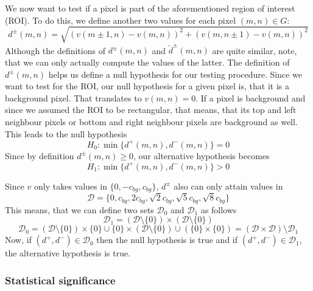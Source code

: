 \documentclass[a4paper,12pt]{article}
\theoremstyle{plain}
\theoremstyle{definition}
\theoremstyle{remark}
\begin{document}
We now want to test if a pixel is part of the aforementioned region of interest (ROI). To do this, we define another two values for each pixel $(m, n) \in G$:
\begin{equation}\label{d}
	d^\pm(m, n) = \sqrt{(v(m \pm 1, n) - v(m, n))^2 + (v(m, n \pm 1) - v(m, n))^2}
\end{equation}
Although the definitions of $d^\pm(m, n)$ and $\tilde{d}^\pm(m, n)$ are quite similar, note, that we can only actually compute the values of the latter. The definition of $d^\pm(m, n)$ helps us define a null hypothesis for our testing procedure. Since we want to test for the ROI, our null hypothesis for a given pixel is, that it is a background pixel. That translates to $v(m, n) = 0$. If a pixel is background and since we assumed the ROI to be rectangular, that means, that its top and left neighbour pixels or bottom and right neighbour pixels are background as well. This leads to the null hypothesis
\begin{equation}
	H_0 : \min\{ d^+(m, n), d^-(m, n) \} = 0
\end{equation}
Since by definition $d^\pm(m, n) \geq 0$, our alternative hypothesis becomes
\begin{equation}
	H_1 : \min\{ d^+(m, n), d^-(m, n) \} > 0
\end{equation}

Since $v$ only takes values in $\{ 0, -c_{bg}, c_{bg} \}$, $d^\pm$ also can only attain values in
\begin{equation*}
	\mathcal{D} = \{ 0, c_{bg}, 2 c_{bg}, \sqrt{2} c_{bg}, \sqrt{5} c_{bg}, \sqrt{8} c_{bg} \}
\end{equation*}
This means, that we can define two sets $\mathcal{D}_0$ and $\mathcal{D}_1$ as follows
\begin{equation*}
	\mathcal{D}_1 = ( \mathcal{D} \setminus \{ 0 \} ) \times ( \mathcal{D} \setminus \{ 0 \} )
\end{equation*}
\begin{equation*}
	\mathcal{D}_0 = ( \mathcal{D} \setminus \{ 0 \} ) \times \{ 0 \} \cup \{ 0 \} \times ( \mathcal{D} \setminus \{ 0 \} ) \cup ( \{ 0 \} \times \{ 0 \} ) = ( \mathcal{D} \times \mathcal{D} ) \setminus \mathcal{D}_1
\end{equation*}
Now, if $(d^+, d^-) \in \mathcal{D}_0$ then the null hypothesis is true and if $(d^+, d^-) \in \mathcal{D}_1$, the alternative hypothesis is true.

\subsubsection{Statistical significance}
\end{document}
